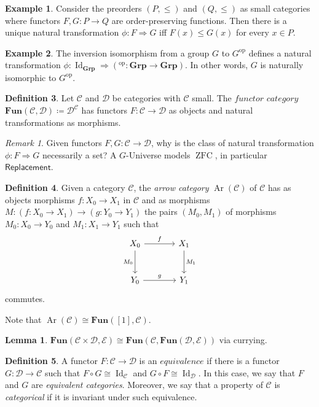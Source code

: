 \documentclass[10pt,letterpaper,cm]{nupset}
\theoremstyle{definition}
\newtheorem{definition}{Definition}
\newtheorem{exmp}[definition]{Example}
\theoremstyle{theorem}
\newtheorem{lemma}[theorem]{Lemma}
\theoremstyle{remark}
\newtheorem{remark}{Remark}
\newcommand{\1}{\mathbf{1}}
\renewcommand{\c}{\mathscr{C}}
\renewcommand{\d}{\mathscr{D}}
\newcommand{\e}{\mathscr{E}}
\newcommand{\0}{\vec 0}
\DeclareMathOperator{\id}{Id}
\DeclareMathOperator{\op}{op}
\DeclareMathOperator{\ar}{Ar}
\DeclareMathOperator{\ZFC}{ZFC}
\begin{document}
\begin{exmp}
Consider the preorders $(P, \leq)$ and $(Q, \leq)$ as small categories where functors $F, G: P \to Q$ are order-preserving functions. Then there is a unique natural transformation $\phi: F \Rightarrow G$ iff $F(x) \leq G(x)$ for every $x\in P$.
\end{exmp}

\begin{exmp}\label{grp}
The inversion isomorphism from a group $G$ to $G^{\op}$ defines a natural transformation $\phi: \id_{\mathbf{Grp}} \Rightarrow (^{\op}: \mathbf{Grp} \to \mathbf{Grp})$. In other words, $G$ is naturally isomorphic to $G^{\op}$.
\end{exmp}

\begin{definition}
Let $\c$ and $\d$ be categories with $\c$ small. The $\textit{functor category}$ $\mathbf{Fun}(\c, \d)\coloneqq \d^\c$ has functors $F: \c \to \d$ as objects and natural transformations as morphisms. 
\end{definition}

\begin{remark}
Given functors $F, G: \c \to \d$, why is the class of natural transformation $\phi: F \Rightarrow G$ necessarily a set?
A $G$-Universe models $\ZFC$, in particular $\mathsf{Replacement}$.
\end{remark}

\begin{definition}
Given a category $\c$, the \textit{arrow category} $\ar(\c)$ of $\c$ has as objects morphisms $f: X_0 \to X_1$ in $\c$ and as morphisms $M: \left(f: X_0 \to X_1\right) \to \left(g: Y_0 \to Y_1\right)$ the pairs $\left(M_0, M_1\right)$ of morphisms $M_0 : X_0 \to Y_0$ and $M_1 : X_1 \to Y_1$ such that
\[
\begin{tikzcd}[row sep=large, column sep = large]
X_0 \arrow[r, "f"] \arrow[d, "M_0", swap]
& X_1 \arrow[d, "M_1"] \\
Y_0 \arrow[r, "g"]
& Y_1
\end{tikzcd}
\]
commutes. 
\end{definition}

Note that $\ar(\c) \cong \mathbf{Fun}([1], \c)$.

\begin{lemma}
$\mathbf{Fun}(\c \times \d, \e) \cong \mathbf{Fun}(\c, \mathbf{Fun}( \d, \e))$ via currying. 
\end{lemma}

\begin{definition}
A functor $F: \c \to \d$ is an $\textit{equivalence}$ if there is a functor $G: \d \to \c$ such that $F \circ G \cong \id_{\c}$ and $G \circ F \cong \id_{\d}$. In this case, we say that $F$ and $G$ are \textit{equivalent categories}. Moreover, we say that a property of $\c$ is \textit{categorical} if it is invariant under such equivalence.
\end{definition}
\end{document}
